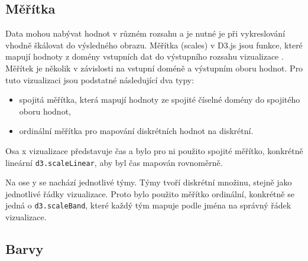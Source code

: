 \documentclass[
  digital, %
  oneside, %
  table,   %
  nolof,     %
  nolot,     %
]{fithesis3}
\begin{document}
\subsection{Měřítka}
Data mohou nabývat hodnot v různém rozsahu a je nutné je při vykreslování vhodně škálovat do výsledného obrazu. Měřítka (scales) v D3.js jsou funkce, které mapují hodnoty z domény vstupních dat do výstupního rozsahu vizualizace \cite{d3jsorg}. Měřítek je několik v závislosti na vstupní doméně a výstupním oboru hodnot. Pro tuto vizualizaci jsou podstatné následující dva typy:
\begin{itemize}
  \item spojitá měřítka, která mapují hodnoty ze spojité číselné domény do spojitého oboru hodnot,
  \item ordinální měřítka pro mapování diskrétních hodnot na diskrétní.
\end{itemize}
Osa x vizualizace představuje čas a bylo pro ni použito spojité měřítko, konkrétně lineární \verb|d3.scaleLinear|, aby byl čas mapován rovnoměrně.\par
Na ose y se nachází jednotlivé týmy. Týmy tvoří diskrétní množinu, stejně jako jednotlivé řádky vizualizace. Proto bylo použito měřítko ordinální, konkrétně se jedná o \verb|d3.scaleBand|, které každý tým mapuje podle jména na správný řádek vizualizace.

\subsection{Barvy}
\end{document}
